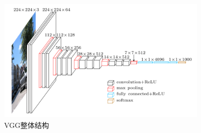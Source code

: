 \begin{figure}[h]
  \centering
  \includegraphics[width=10cm, height=6cm]{Img/vgg.png}
  \caption{VGG整体结构\cite{simonyan2014very}}
  \label{fig:vgg}
\end{figure}
